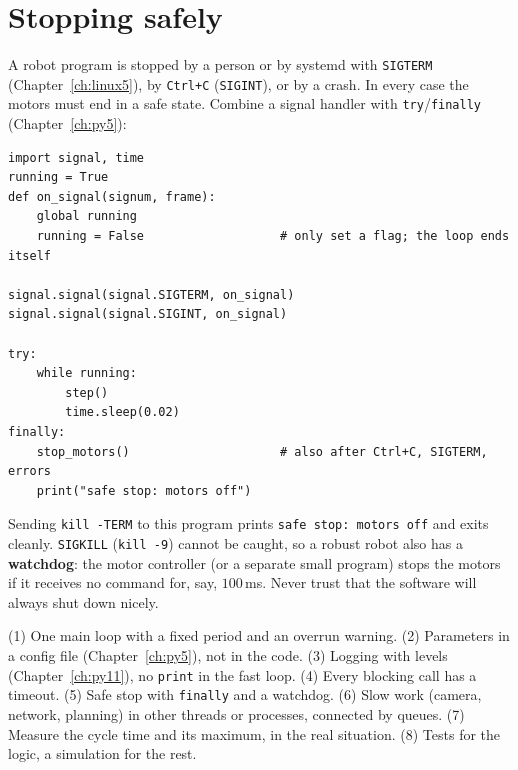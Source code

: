 \section*{Stopping safely}
A robot program is stopped by a person or by systemd with \texttt{SIGTERM} (Chapter~\ref{ch:linux5}), by \texttt{Ctrl+C} (\texttt{SIGINT}), or by a crash. In every case the motors must end in a safe state. Combine a signal handler with \texttt{try}/\texttt{finally} (Chapter~\ref{ch:py5}):
\begin{verbatim}
import signal, time
running = True
def on_signal(signum, frame):
    global running
    running = False                   # only set a flag; the loop ends itself

signal.signal(signal.SIGTERM, on_signal)
signal.signal(signal.SIGINT, on_signal)

try:
    while running:
        step()
        time.sleep(0.02)
finally:
    stop_motors()                     # also after Ctrl+C, SIGTERM, errors
    print("safe stop: motors off")
\end{verbatim}
Sending \texttt{kill -TERM} to this program prints \texttt{safe stop: motors off} and exits cleanly. \texttt{SIGKILL} (\texttt{kill -9}) cannot be caught, so a robust robot also has a \textbf{watchdog}: the motor controller (or a separate small program) stops the motors if it receives no command for, say, $100$\,ms. Never trust that the software will always shut down nicely.

\begin{keyidea}
(1) One main loop with a fixed period and an overrun warning. (2) Parameters in a config file (Chapter~\ref{ch:py5}), not in the code. (3) Logging with levels (Chapter~\ref{ch:py11}), no \texttt{print} in the fast loop. (4) Every blocking call has a timeout. (5) Safe stop with \texttt{finally} and a watchdog. (6) Slow work (camera, network, planning) in other threads or processes, connected by queues. (7) Measure the cycle time and its maximum, in the real situation. (8) Tests for the logic, a simulation for the rest.
\end{keyidea}

